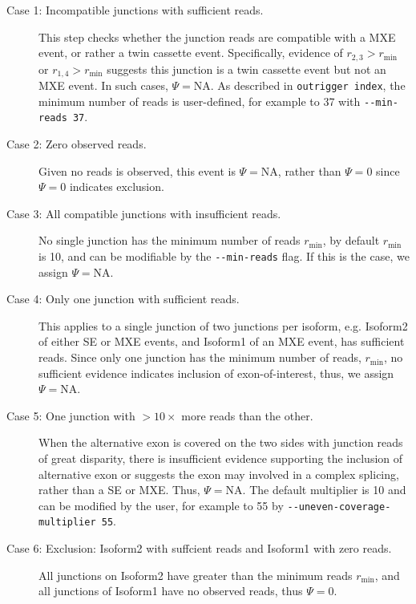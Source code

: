 \clearpage

\begin{description}
	\item[Case 1: Incompatible junctions with sufficient reads.] This step checks whether the junction reads are compatible with a MXE event, or rather a twin cassette event. Specifically, evidence of  $r_{2,3} > r_{\min}$ or $r_{1,4} > r_{\min}$ suggests this junction is a twin cassette event but not an MXE event. In such cases, $\Psi = \text{NA}$. As described in \texttt{outrigger index}, the minimum number of reads is user-defined, for example to 37 with \texttt{-{}-min-reads~37}.
	\item[Case 2: Zero observed reads.] Given no reads is observed, this event is $\Psi = \text{NA}$, rather than $\Psi=0$ since $\Psi=0$ indicates exclusion.
	\item[Case 3: All compatible junctions with insufficient reads.] No single junction has the minimum number of reads $r_{\min}$, by default $r_{\min}$ is 10, and can be modifiable by the \texttt{-{}-min-reads} flag. If this is the case, we assign $\Psi = \text{NA}$.
	\item[Case 4: Only one junction with sufficient reads.] This applies to a single junction of two junctions per isoform, e.g. Isoform2 of either SE or MXE events, and Isoform1 of an MXE event, has sufficient reads. Since only one junction has the minimum number of reads, $r_{\min}$, no sufficient evidence indicates inclusion of exon-of-interest, thus, we assign $\Psi = \text{NA}$.
	\item[Case 5: One junction with $>10\times$ more reads than the other.] When the alternative exon is covered on the two sides with junction reads of great disparity, there is insufficient evidence supporting the inclusion of alternative exon or suggests the exon may involved in a complex splicing, rather than a SE or MXE. Thus, $\Psi = \text{NA}$. The default multiplier is 10 and can be modified by the user, for example to 55 by \texttt{-{}-uneven-coverage-multiplier~55}.
	\item[Case 6: Exclusion: Isoform2 with suffcient reads and Isoform1 with zero reads.] All junctions on Isoform2 have greater than the minimum reads $r_{\min}$, and all junctions of Isoform1 have no observed reads, thus $\Psi = 0$.

\end{description}
